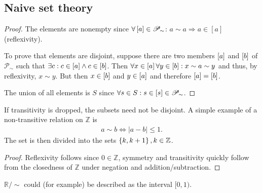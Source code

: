 \subsection{Naive set theory}

\begin{proof}
    The elements are nonempty since
    $\forall \left[a\right] \in \mathscr{P}_{\sim}$: $a \sim a \Rightarrow a \in [a]$ (reflexivity). 
    
    To prove that elements are disjoint, suppose there are two members $\left[a\right]$ and $\left[b\right]$ of $\mathscr{P}_{\sim}$ such that $\exists c: c \in \left[a\right] \wedge c \in \left[b\right]$. Then $\forall x \in \left[a\right] \forall y \in \left[b\right]: x \sim a \sim y$ and thus, by reflexivity, $x \sim y$. But then $x \in \left[b\right]$ and $y \in \left[a\right]$ and therefore $\left[a\right] = \left[b\right]$. 

    The union of all elements is $S$ since $\forall s \in S: s \in \left[s\right] \in \mathscr{P}_{\sim}$.
\end{proof}


If transitivity is dropped, the subsets need not be disjoint. A simple example of a non-transitive relation on $\mathbb{Z}$ is 
\begin{align}
    a \sim b \Leftrightarrow |a - b| \leq 1.
\end{align} 
The set is then divided into the sets $\left\{k, k+1\right\}, k \in \mathbb{Z}$.

\begin{proof}
    Reflexivity follows since $0 \in \mathbb{Z}$, symmetry and transitivity quickly follow from the closedness of $\mathbb{Z}$ under negation and addition/subtraction.
\end{proof}
$\mathbb{R} / \sim$ could (for example) be described as the interval $[0, 1)$.
